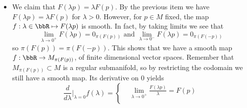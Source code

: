 \begin{itemize}
\begin{equation}
\begin{split}
        &=v_{\gamma(t)}.
       \end{split}
    \end{equation}
    Then we see that $\gamma$ is the integral curve of $v$ starting at $p$. Therefore $\gamma(t)=\varphi_t^v(p)$ by 
    uniqueness of integral curves. Now we compute explictly the flux $\varphi_t^v$ of $v$. We need to solve the EDO 
    \begin{equation}
        \frac{\partial}{\partial t}\varphi_t^v(p) =  v_{\varphi_t^v(p)}.
    \end{equation}
    The left hand side is 
    \begin{equation}
        \sum_i(\barx_i\circ\varphi_t^v(p))^\prime(t)\frac{\partial}{\partial\barx_i}
        +\sum_i(\xi_i\circ\varphi_t^v(p))^\prime(t)\frac{\partial}{\partial\xi_i}.
    \end{equation}
    Using the expression of the Euler vector field obtained before, we get 
    \begin{equation}
        \left\{\begin{aligned}
            &(\barx_i\circ\varphi_t^v(p))^\prime(t)=0\\
            &(\xi_i\circ\varphi_t^v(p))^\prime(t)=\xi_i\circ \varphi_t^v(p)
        \end{aligned}\right.
    \end{equation}
    So $\barx_i\circ\varphi_t^v(p)=\barx_i\circ\varphi_0^v(p)=\barx_i(p)$ and 
    $\xi_i\circ\varphi_t^v(p)=\xi_i(p)e^t$. Therefore $\varphi_t^v(p)=e^tp$.
    \item  We claim that $F(\lambda p)=\lambda F(p)$. 
    By the previous item we have $F(\lambda p)=\lambda F(p)$ for $\lambda>0$. However, for $p\in M$ fixed, the map 
    $f:\lambda\in\bbR\mapsto F(\lambda p)$ is smooth. In fact, by taking limits we see that 
    \begin{equation}
        \lim_{\lambda\to0^+}F(\lambda p)=0_{\pi(F(p))}\text{ and }\lim_{\lambda\to0^-}F(\lambda p)=0_{\pi(F(-p))}
    \end{equation}
    so $\pi(F(p))=\pi(F(-p))$. This shows that we have a smooth map $f:\bbR\to M_{\pi(F(p))}$, 
    of finite dimensional vector spaces. Remember that $M_{\pi(F(p))}\subset M$ is a regular submanifold, so by restricting 
    the codomain we still have a smooth map. Its derivative on 0 yields
    \begin{equation}
        \frac{d}{d\lambda}\bigg|_{\lambda=0}f(\lambda)=\left\{\begin{aligned}
         &\lim_{\lambda\to0^+}\frac{F(\lambda p)}{\lambda}=F(p)\\

\end{aligned}
\end{equation}
\end{itemize}
